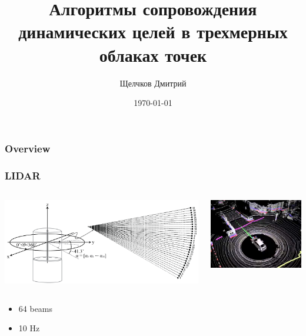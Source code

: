 \documentclass[xcolor=table,usenames,dvipsnames]{beamer}
\title[АСДЦвТОЧ]{Алгоритмы сопровождения динамических целей в трехмерных облаках точек} %
\date{\today} %
\author{Щелчков Дмитрий}
\begin{document}
\begin{frame}
\titlepage %
\end{frame}

\begin{frame}
\frametitle{Overview} %
\tableofcontents %
\end{frame}
\begin{frame}
\frametitle{LIDAR}
\begin{columns}
\begin{column}{0.5\textwidth}
\includegraphics[width=\textwidth, height=0.5\textheight]{img/lidar.png}
\end{column}
\begin{column}{0.5\textwidth}
\includegraphics[width=\textwidth, height=0.5\textheight]{img/lidar_data.jpg}
\end{column}
\end{columns}
\begin{itemize}
\item 64 beams
\item 10 Hz
\end{itemize}
\end{frame}
\end{document}
